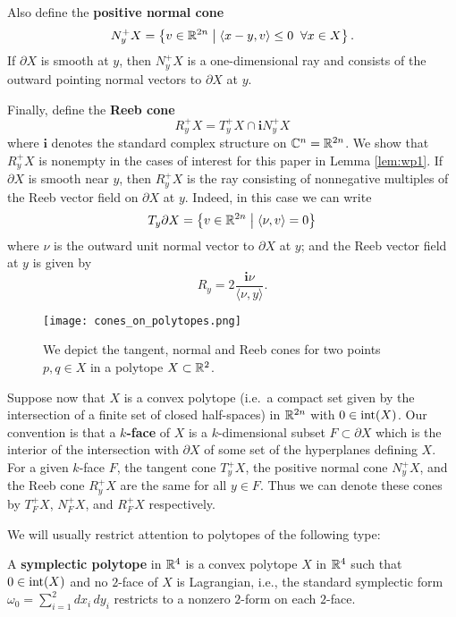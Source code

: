 Also define the {\bf positive normal cone\/}
\[
N_y^+X = \left\{v\in{\mathbb R}^{2n}\;\big|\;\langle x-y,v\rangle\le 0\;\;\forall x\in X\right\}.
\]
If $\partial X$ is smooth at $y$, then $N_y^+X$ is a one-dimensional ray and consists of the outward pointing normal vectors to $\partial X$ at $y$. 

Finally, define the {\bf Reeb cone\/}
\[
R_y^+X = T_y^+X\cap {\mathbf i}N_y^+X
\]
where ${\mathbf i}$ denotes the standard complex structure on ${\mathbb C}^n={\mathbb R}^{2n}$. We show that $R^+_yX$ is nonempty in the cases of interest for this paper in Lemma \ref{lem:wp1}. If $\partial X$ is smooth near $y$, then $R_y^+X$ is the ray consisting of nonnegative multiples of the Reeb vector field on $\partial X$ at $y$. Indeed, in this case we can write
\[
T_y\partial X = \left\{v\in{\mathbb R}^{2n}\;\big|\;\langle \nu,v\rangle=0\right\}
\]
where $\nu$ is the outward unit normal vector to $\partial X$ at $y$; and the Reeb vector field at $y$ is given by
\begin{equation}
\label{eqn:Reebinu}
R_y = 2\frac{{\mathbf i}\nu}{\langle \nu,y\rangle}.
\end{equation}

\begin{figure}[h!]
\label{fig:cones_on_polytopes}
\begin{center}
\texttt{[image: cones\_on\_polytopes.png]}
\end{center}
\caption{We depict the tangent, normal and Reeb cones for two points $p,q \in X$ in a polytope $X \subset {\mathbb R}^2$.}
\end{figure}

Suppose now that $X$ is a convex polytope (i.e.\ a compact set given by the intersection of a finite set of closed half-spaces) in ${\mathbb R}^{2n}$ with $0\in\operatorname{int}(X)$.
Our convention is that a {\bf $k$-face\/} of $X$ is a $k$-dimensional subset $F\subset \partial X$ which is the interior of the intersection with $\partial X$ of some set of the hyperplanes defining $X$. For a given $k$-face $F$, the tangent cone $T_y^+X$, the positive normal cone $N_y^+X$, and the Reeb cone $R_y^+X$ are the same for all $y\in F$. Thus we can denote these cones by $T_F^+X$, $N_F^+X$, and $R_F^+X$ respectively.

We will usually restrict attention to polytopes of the following type:

\begin{definition}
\label{def:symplectic_polytope}
A {\bf symplectic polytope\/} in ${\mathbb R}^4$ is a convex polytope $X$ in ${\mathbb R}^4$ such that $0\in\operatorname{int}(X)$ and no $2$-face of $X$ is Lagrangian, i.e., the standard symplectic form $\omega_0 = \sum_{i=1}^2dx_i\,dy_i$ restricts to a nonzero $2$-form on each $2$-face.
\end{definition}

